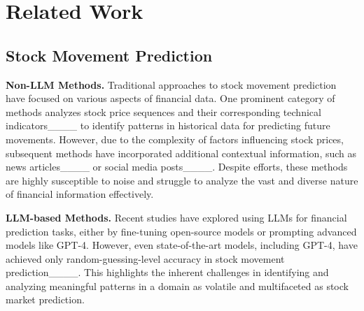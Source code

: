 \section{Related Work}

\subsection{Stock Movement Prediction}
\textbf{Non-LLM Methods.}
Traditional approaches to stock movement prediction have focused on various aspects of financial data. One prominent category of methods analyzes stock price sequences and their corresponding technical indicators____ to identify patterns in historical data for predicting future movements. However, due to the complexity of factors influencing stock prices, subsequent methods have incorporated additional contextual information, such as news articles____  or social media posts____. Despite efforts, these methods are highly susceptible to noise and struggle to analyze the vast and diverse nature of financial information effectively.

\noindent
\textbf{LLM-based Methods.}
Recent studies have explored using LLMs for financial prediction tasks, either by fine-tuning open-source models or prompting advanced models like GPT-4. However, even state-of-the-art models, including GPT-4, have achieved only random-guessing-level accuracy in stock movement prediction____. This highlights the inherent challenges in identifying and analyzing meaningful patterns in a domain as volatile and multifaceted as stock market prediction.

